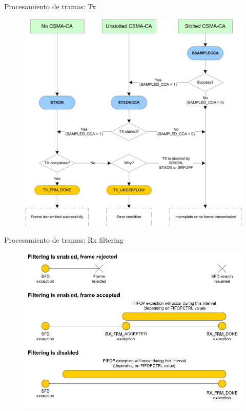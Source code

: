 \documentclass[aspectratio=169]{beamer}
\begin{document}
\begin{frame}{Procesamiento de tramas: Tx}
	\begin{figure}[H]
		\includegraphics[height=.95\textheight]{./imagenes/txfifo.jpg}
	\end{figure}	
\end{frame}

\begin{frame}{Procesamiento de tramas: Rx filtering}
	\begin{figure}[H]
		\includegraphics[height=.95\textheight]{./imagenes/filtering.jpg}
	\end{figure}	
\end{frame}
\end{document}
